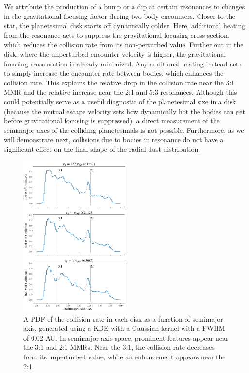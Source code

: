 \documentclass[twocolumn]{aastex63}
\begin{document}
We attribute the production of a bump or a dip at certain resonances to changes in the gravitational focusing factor during two-body encounters. 
Closer to the star, the planetesimal disk starts off dynamically colder. Here, additional heating from the resonance acts to suppress the gravitational 
focusing cross section, which reduces the collision rate from its
non-perturbed value. Further out in the disk, where the unperturbed
encounter velocity is higher, the gravitational focusing cross section
is already minimized. Any additional heating instead acts to simply
increase the encounter rate between bodies, which enhances the
collision rate. This explains the relative drop in the collision rate
near the 3:1 MMR and the relative increase near the 2:1 and 5:3
resonances. Although this could potentially serve as a useful
diagnostic of the planetesimal size in a disk (because the mutual
escape velocity sets how dynamically hot the bodies can get before
gravitational focusing is suppressed), a direct measurement of the
semimajor axes of the colliding planetesimals is not
possible. Furthermore, as we will demonstrate next, collisions due to bodies in resonance do not have a significant effect on the final shape of the radial dust distribution.

\begin{figure}
\begin{center}
    \includegraphics[width=0.5\textwidth]{figures/coll_hist_a.png}
    \caption{A PDF of the collision rate in each disk as a function of semimajor axis, generated using a KDE with a Gaussian kernel with a FWHM of 0.02 AU. In semimajor axis space, prominent features appear near the 3:1 and 2:1 MMRs. Near the 3:1, the collision rate decreases from its unperturbed value, while an enhancement appears near the 2:1.\label{fig:coll_hist_a}}
\end{center}
\end{figure}
\end{document}
